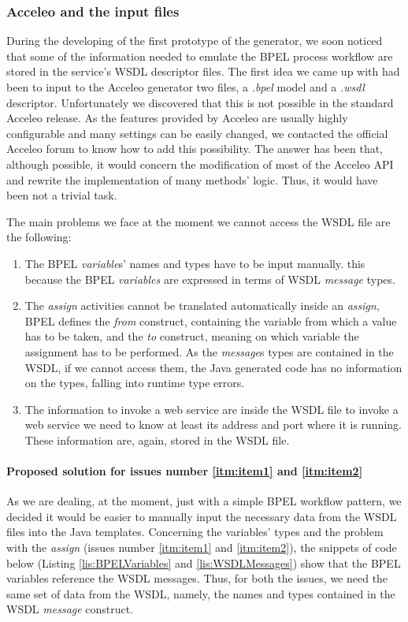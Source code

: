 \subsubsection{Acceleo and the input files}
\label{sec:IssueInputFiles}
During the developing of the first prototype of the generator, we soon noticed that some of the information needed to emulate the BPEL process workflow are stored in the service's WSDL descriptor files. 
The first idea we came up with had been to input to the Acceleo generator two files, a \textit{.bpel} model and a \textit{.wsdl} descriptor. Unfortunately we discovered that this is not possible in the standard Acceleo release. As the features provided by Acceleo are usually highly configurable and many settings can be easily changed, we contacted the official Acceleo forum \cite{acceleoForum} to know how to add this possibility. The answer has been that, although possible, it would concern the modification of most of the Acceleo API and rewrite the implementation of many methods' logic. Thus, it would have been not a trivial task.

The main problems we face at the moment we cannot access the WSDL file are the following: 
\begin{enumerate}
  \item \label{itm:item1}The BPEL \textit{variable}s' names and types have to be input manually. 
    \subitem this because the BPEL \textit{variables} are expressed in terms of WSDL \textit{message} types.  
  \item \label{itm:item2}The \textit{assign} activities cannot be translated automatically
    \subitem inside an \textit{assign}, BPEL defines the \textit{from} construct, containing the variable from which a value has to be taken, and the \textit{to} construct, meaning on which variable the assignment has to be performed. As the \textit{message}s types are contained in the WSDL, if we cannot access them, the Java generated code has no information on the types, falling into runtime type errors.
  \item \label{itm:item3}The information to invoke a web service are inside the WSDL file
    \subitem to invoke a web service we need to know at least its address and port where it is running. These information are, again, stored in the WSDL file. 
\end{enumerate}

\paragraph{Proposed solution for issues number \ref{itm:item1} and \ref{itm:item2}}
As we are dealing, at the moment, just with a simple BPEL workflow pattern, we decided it would be easier to manually input the necessary data from the WSDL files into the Java templates.
Concerning the variables' types and the problem with the \textit{assign} (issues number \ref{itm:item1} and \ref{itm:item2}), the snippets of code below (Listing \ref{lis:BPELVariables} and \ref{lis:WSDLMessages}) show that the BPEL variables reference the WSDL messages. Thus, for both the issues, we need the same set of data from the WSDL, namely, the names and types contained in the WSDL \textit{message} construct. 

